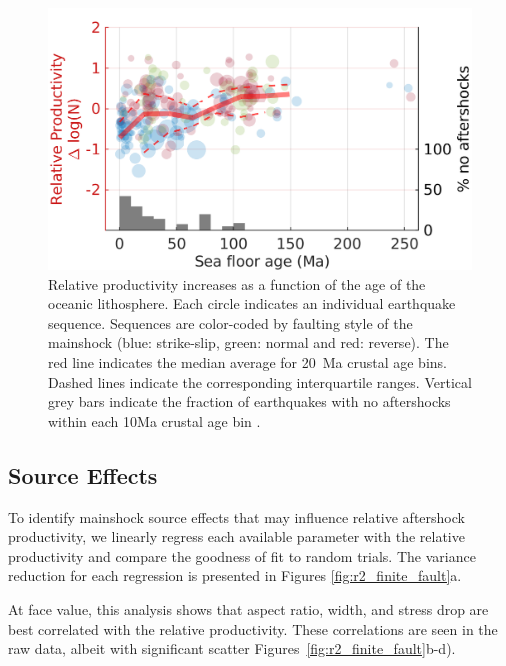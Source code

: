 \documentclass[draft, jgrga]{agujournal2018}
\begin{document}
    \begin{figure}
        \centering
        \includegraphics{figures/prod_vs_age.png}
        \caption{Relative productivity increases as a function of the age of the oceanic lithosphere. Each circle indicates an individual earthquake sequence. Sequences are color-coded by faulting style of the mainshock (blue: strike-slip, green: normal and red: reverse). The red line indicates the median average for 20~Ma crustal age bins. Dashed lines indicate the corresponding interquartile ranges. Vertical grey bars indicate the fraction of earthquakes with no aftershocks within each 10Ma crustal age bin .}
        \label{fig:prod_vs_age}
    \end{figure}
    
    \subsection{Source Effects}\label{sec:source_parameters}

    To identify mainshock source effects that may influence relative aftershock productivity, we linearly regress each available parameter with the relative productivity and compare the goodness of fit to random trials. The variance reduction for each regression is presented in Figures \ref{fig:r2_finite_fault}a. 
    
    At face value, this analysis shows that aspect ratio, width, and stress drop are best correlated with the relative productivity. These correlations are seen in the raw data, albeit with significant scatter Figures~\ref{fig:r2_finite_fault}b-d).
    
\end{document}
